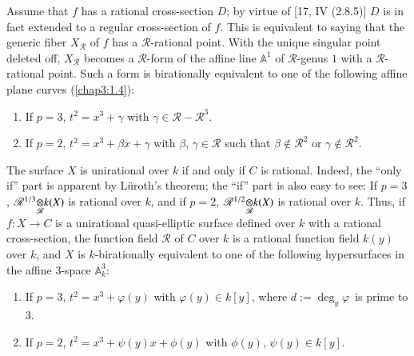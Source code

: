 Assume that $f$ has a rational cross-section $D$; by virtue of [17, IV
  (2.8.5)] $D$ is in fact extended to a regular cross-section of
$f$. This is equivalent to saying that the generic fiber
$X_{\mathscr{R}}$ of $f$ has a $\mathscr{R}$-rational point. With the
unique singular point deleted off, $X_{\mathscr{R}}$ becomes a
$\mathscr{R}$-form of the affine line $\mathbb{A}^{1}$ of
$\mathscr{R}$-genus $1$ with a $\mathscr{R}$-rational point. Such a
form is birationally equivalent to one of the following affine plane
curves (\cf \ref{chap3:1.4}):
\begin{enumerate}
\renewcommand{\theenumi}{\roman{enumi}}
\renewcommand{\labelenumi}{(\theenumi)}
\item If $p=3$, $t^{2}=x^{3}+\gamma$ with
  $\gamma\in\mathscr{R}-\mathscr{R}^{3}$. 

\item If $p=2$, $t^{2}=x^{3}+\beta x+\gamma$ with $\beta$, $\gamma\in
  \mathscr{R}$ such that $\beta\not\in \mathscr{R}^{2}$ or
  $\gamma\not\in \mathscr{R}^{2}$.
\end{enumerate}
The surface $X$ is unirational over $k$ if and only if $C$ is
rational. Indeed, the ``only if'' part is apparent by L\"uroth's
theorem; the ``if'' part is also easy to see: If $p=3$,
$\foprod{\mathscr{R}^{1/3}}{k(X)}{\mathscr{R}}$ is rational over $k$,
and if $p=2$, $\foprod{\mathscr{R}^{1/2}}{k(X)}{\mathscr{R}}$ is
rational over $k$. Thus, if $f:X\to C$ is a unirational quasi-elliptic
surface defined over $k$ with a rational cross-section, the function
field $\mathscr{R}$ of $C$ over $k$ is a rational function field
$k(y)$ over $k$, and $X$ is $k$-birationally equivalent to one of the
following hypersurfaces in the affine $3$-space $\mathbb{A}^{3}_{k}$:
\begin{enumerate}
\renewcommand{\theenumi}{\roman{enumi}}
\renewcommand{\labelenumi}{(\theenumi)$'$}
\item If $p=3$, $t^{2}=x^{3}+\varphi(y)$ with $\varphi(y)\in k[y]$,
  where $d:=\deg_{y}\varphi$\pageoriginale\ is prime to $3$.

\item If $p=2$, $t^{2}=x^{3}+\psi(y)x+\phi(y)$ with $\phi(y)$,
  $\psi(y)\in k[y]$.
\end{enumerate}


